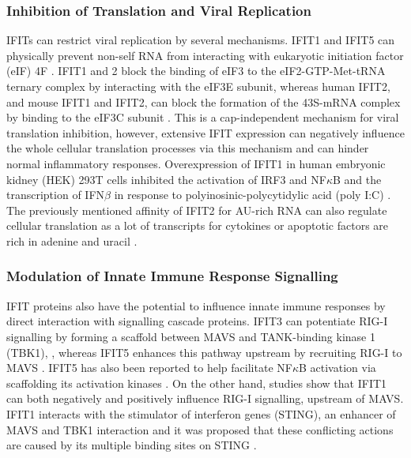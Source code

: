 \subsubsection{Inhibition of Translation and Viral Replication} \label{Inhibition of Translation and Viral Replication}
IFITs can restrict viral replication by several mechanisms. IFIT1 and IFIT5 can physically prevent non-self RNA from interacting with eukaryotic initiation factor (eIF) 4F \cite{Kumar2014InhibitionMRNAs}. IFIT1 and 2 block the binding of eIF3 to the eIF2-GTP-Met-tRNA ternary complex by interacting with the eIF3E subunit, whereas human IFIT2, and mouse IFIT1 and IFIT2, can block the formation of the 43S-mRNA complex by binding to the eIF3C subunit \cite{Diamond2014IFIT1:Translation, Guo2000CharacterizationVirus}. This is a cap-independent mechanism for viral translation inhibition, however, extensive IFIT expression can negatively influence the whole cellular translation processes via this mechanism and can hinder normal inflammatory responses. Overexpression of IFIT1 in human embryonic kidney (HEK) 293T cells inhibited the activation of IRF3 and NF\(\kappa\)B and the transcription of IFN\(\beta\) in response to polyinosinic-polycytidylic acid (poly I:C) \cite{Li2009ISG56Response}. The previously mentioned affinity of IFIT2 for AU-rich RNA can also regulate cellular translation as a lot of transcripts for cytokines or apoptotic factors are rich in adenine and uracil \cite{Palanisamy2012ControlMicroRNAs}. 

\subsubsection{Modulation of Innate Immune Response Signalling} \label{Modulation of Innate Immune Response Signalling}
IFIT proteins also have the potential to influence innate immune responses by direct interaction with signalling cascade proteins. IFIT3 can potentiate RIG-I signalling by forming a scaffold between MAVS and TANK-binding kinase 1 (TBK1), \cite{Liu2011IFN-InducedTBK1}, whereas IFIT5 enhances this pathway upstream by recruiting RIG-I to MAVS \cite{Zhang2013IFIT5Pathways}. IFIT5 has also been reported to help facilitate NF\(\kappa\)B activation via scaffolding its activation kinases \cite{Zhang2013IFIT5Pathways}. On the other hand, studies show that IFIT1 can both negatively and positively influence RIG-I signalling, upstream of MAVS. IFIT1 interacts with the stimulator of interferon genes (STING), an enhancer of MAVS and TBK1 interaction and it was proposed that these conflicting actions are caused by its multiple binding sites on STING \cite{Li2009ISG56Response, Reynaud2015IFIT1Interferon}. 

